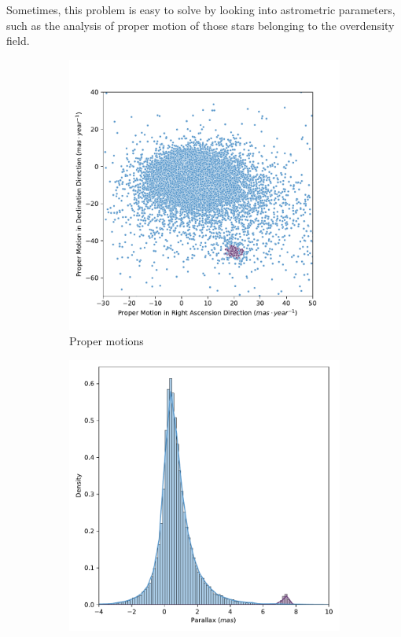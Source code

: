 \documentclass[11pt, a4paper, english]{book}
\begin{document}
Sometimes, this problem is easy to solve by looking into astrometric parameters, such as the analysis of proper motion of those
stars belonging to the overdensity field.

\begin{figure}[htbp]
  \centering
  \begin{subfigure}[t]{0.45\textwidth}
    \centering
    \includegraphics[width=\textwidth]{../figures/pm_melotte_22.pdf}
    \caption{Proper motions}
    \label{fig:pm_melotte_22}
  \end{subfigure}
  \hfill
  \begin{subfigure}[t]{0.45\textwidth}
    \centering
    \includegraphics[width=\textwidth]{../figures/parallax_melotte_22.pdf}

\end{subfigure}
\end{figure}
\end{document}
